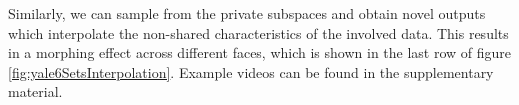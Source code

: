 
Similarly, we can sample from the private subspaces and obtain novel
outputs which interpolate the non-shared characteristics of the
involved data.  This results in a morphing effect across different
faces, which is shown in the last row of figure
\ref{fig:yale6SetsInterpolation}.  Example videos can be
found in the supplementary material.


